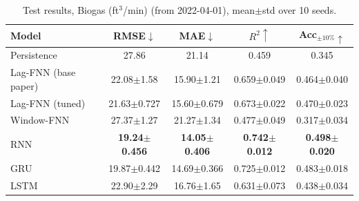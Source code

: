 \begin{table}[!t]
\centering
\caption{Test results, Biogas (ft$^3$/min) (from 2022-04-01), mean$\pm$std over 10 seeds.}
\label{tab:results}
\begin{tabular}{lcccc}
\toprule
Model & RMSE$\downarrow$ & MAE$\downarrow$ & $R^2\uparrow$ & Acc$_{\pm10\%}\uparrow$ \\
\midrule
Persistence & 27.86 & 21.14 & 0.459 & 0.345 \\
Lag-FNN (base paper) & 22.08$\pm$1.58 & 15.90$\pm$1.21 & 0.659$\pm$0.049 & 0.464$\pm$0.040 \\
Lag-FNN (tuned) & 21.63$\pm$0.727 & 15.60$\pm$0.679 & 0.673$\pm$0.022 & 0.470$\pm$0.023 \\
Window-FNN & 27.37$\pm$1.27 & 21.27$\pm$1.34 & 0.477$\pm$0.049 & 0.317$\pm$0.034 \\
RNN & \textbf{19.24$\pm$0.456} & \textbf{14.05$\pm$0.406} & \textbf{0.742$\pm$0.012} & \textbf{0.498$\pm$0.020} \\
GRU & 19.87$\pm$0.442 & 14.69$\pm$0.366 & 0.725$\pm$0.012 & 0.483$\pm$0.018 \\
LSTM & 22.90$\pm$2.29 & 16.76$\pm$1.65 & 0.631$\pm$0.073 & 0.438$\pm$0.034 \\
\bottomrule
\end{tabular}
\end{table}
